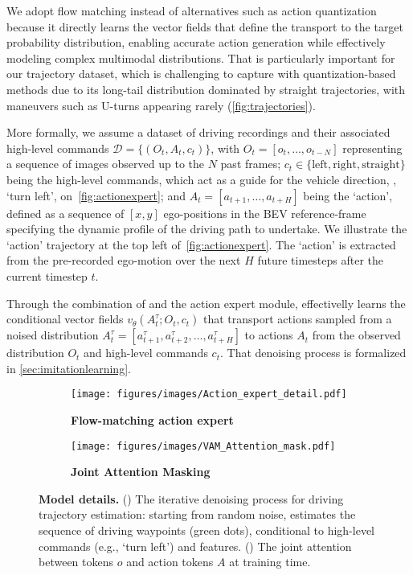 We adopt flow matching instead of alternatives such as action quantization~\cite{lee2024vqbet} because it directly learns the vector fields that define the transport to the target probability distribution, enabling accurate action generation while effectively modeling complex multimodal distributions. That is particularly important for our trajectory dataset, which is challenging to capture with quantization-based methods due to its long-tail distribution dominated by straight trajectories, with maneuvers such as U-turns appearing rarely (\autoref{fig:trajectories}). 

More formally, we assume a dataset of driving recordings and their associated high-level commands $\mathcal{D} = \{(O_t, A_t, c_t)\}$, with $O_t = [o_{t}, \dots, o_{t-N}]$ representing a sequence of images observed up to the $N$ past frames; $c_t \in \{\text{left}, \text{right}, \text{straight}\}$ being the high-level commands, which act as a guide for the vehicle direction, \eg, `turn left', on~\autoref{fig:actionexpert}; and $A_t = [a_{t+1}, \dots, a_{t+H}]$ being the `action', defined as a sequence of $[x, y]$ ego-positions in the BEV reference-frame specifying the dynamic profile of the driving path to undertake. We illustrate the `action' trajectory at the top left of~\autoref{fig:actionexpert}. The `action' is extracted from the pre-recorded ego-motion over the next $H$ future timesteps after the current timestep $t$.

Through the combination of \vm{} and the action expert module, \vam effectivelly learns the conditional vector fields $v_\theta(A^{\tau}_t; O_t, c_t)$ that transport actions sampled from a noised distribution $A^{\tau}_t=[a^{\tau}_{t+1}, a^{\tau}_{t+2}, \dots, a^{\tau}_{t+H}]$ to actions $A_t$ from the observed distribution $O_t$ and high-level commands $c_t$. That denoising process is formalized in \autoref{sec:imitationlearning}.



\begin{figure}[h]
\centering
\begin{subfigure}{0.45\linewidth} 
    \texttt{[image: figures/images/Action\_expert\_detail.pdf]}
      \caption{\textbf{Flow-matching action expert}}
    \label{fig:actionexpert}
\end{subfigure}
\hspace{1.5cm}
\centering
\begin{subfigure}{0.35\linewidth}
    \texttt{[image: figures/images/VAM\_Attention\_mask.pdf]}     
      \caption{\textbf{Joint Attention Masking}}
    \label{fig:joint_attention_mask}
\end{subfigure}
\caption{\textbf{Model details.}  () The iterative denoising process for driving trajectory estimation: starting from random noise, \vam estimates the sequence of driving waypoints (green dots), conditional to high-level commands (e.g., `turn left') and \vm{} features.  () The joint attention between \vm{} tokens $o$ and action tokens $A$ at training time.}
\label{fig:actionexpert_system}
\end{figure}


